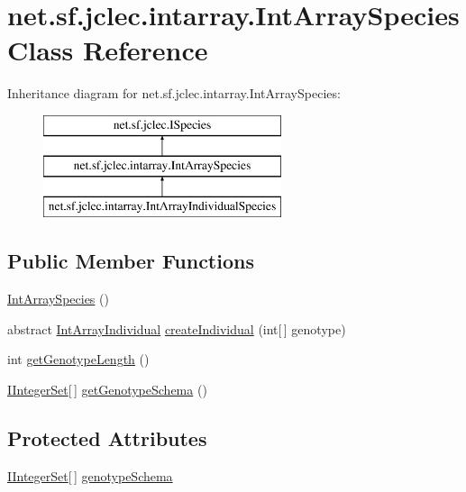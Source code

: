\hypertarget{classnet_1_1sf_1_1jclec_1_1intarray_1_1_int_array_species}{\section{net.\-sf.\-jclec.\-intarray.\-Int\-Array\-Species Class Reference}
\label{classnet_1_1sf_1_1jclec_1_1intarray_1_1_int_array_species}
}
Inheritance diagram for net.\-sf.\-jclec.\-intarray.\-Int\-Array\-Species\-:\begin{figure}[H]
\begin{center}
\leavevmode
\includegraphics[height=3.000000cm]{classnet_1_1sf_1_1jclec_1_1intarray_1_1_int_array_species}
\end{center}
\end{figure}
\subsection*{Public Member Functions}
\begin{DoxyCompactItemize}
\item 
\hyperlink{classnet_1_1sf_1_1jclec_1_1intarray_1_1_int_array_species_ad2d65094b404c0965ac48c469f0d282a}{Int\-Array\-Species} ()
\item 
abstract \hyperlink{classnet_1_1sf_1_1jclec_1_1intarray_1_1_int_array_individual}{Int\-Array\-Individual} \hyperlink{classnet_1_1sf_1_1jclec_1_1intarray_1_1_int_array_species_abd6f2090b12a74d92dbc233075ab71ff}{create\-Individual} (int\mbox{[}$\,$\mbox{]} genotype)
\item 
int \hyperlink{classnet_1_1sf_1_1jclec_1_1intarray_1_1_int_array_species_ab71bcf5ac8dd8c1baa5fc7e5672ac7dc}{get\-Genotype\-Length} ()
\item 
\hyperlink{interfacenet_1_1sf_1_1jclec_1_1util_1_1intset_1_1_i_integer_set}{I\-Integer\-Set}\mbox{[}$\,$\mbox{]} \hyperlink{classnet_1_1sf_1_1jclec_1_1intarray_1_1_int_array_species_a67e9c6a66dfe4cafd666c38c0806bbdc}{get\-Genotype\-Schema} ()
\end{DoxyCompactItemize}
\subsection*{Protected Attributes}
\begin{DoxyCompactItemize}
\item 
\hyperlink{interfacenet_1_1sf_1_1jclec_1_1util_1_1intset_1_1_i_integer_set}{I\-Integer\-Set}\mbox{[}$\,$\mbox{]} \hyperlink{classnet_1_1sf_1_1jclec_1_1intarray_1_1_int_array_species_a715c2117e4b1c70ab004accbf15848b7}{genotype\-Schema}
\end{DoxyCompactItemize}


